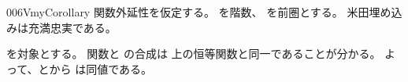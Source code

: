 \documentclass[index]{subfiles}
\begin{document}
\begin{myBlock}{006V}{myCorollary}
  関数外延性を仮定する。
  を階数、
  を前圏とする。
  米田埋め込みは充満忠実である。
\end{myBlock}
\begin{myProof}
  を対象とする。
  関数と
  の合成は
  上の恒等関数と同一であることが分かる。
  よって、とから
  は同値である。
\end{myProof}
\end{document}
